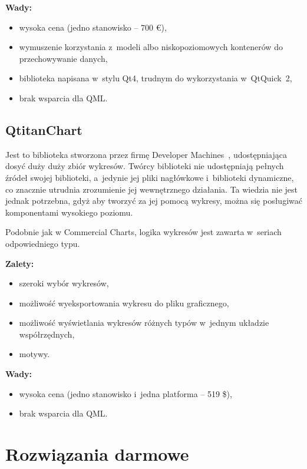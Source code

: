 \documentclass[11pt,twoside,a4paper,final]{llncs}
\begin{document}
\textbf{Wady:}
\begin{itemize}
\item{wysoka cena (jedno stanowisko -- 700 \euro),}
\item{wymuszenie korzystania z~modeli albo niskopoziomowych kontenerów do przechowywanie danych,}
\item{biblioteka napisana w~stylu Qt4, trudnym do wykorzystania w~QtQuick~2,}
\item{brak wsparcia dla QML.}
\end{itemize}

\subsection{QtitanChart}
Jest to biblioteka stworzona przez firmę Developer Machines~\cite{dev-machines}, udostępniająca dosyć duży duży zbiór wykresów. Twórcy biblioteki nie udostępniają pełnych źródeł swojej biblioteki, a~jedynie jej pliki nagłówkowe i~biblioteki dynamiczne, co znacznie utrudnia zrozumienie jej wewnętrznego działania. Ta wiedzia nie jest jednak potrzebna, gdyż aby tworzyć za jej pomocą wykresy, można się posługiwać komponentami wysokiego poziomu.\newline

Podobnie jak w Commercial Charts, logika wykresów jest zawarta w~seriach odpowiedniego typu.\newline

\textbf{Zalety:}
\begin{itemize}
\item{szeroki wybór wykresów,}
\item{możliwość wyeksportowania wykresu do pliku graficznego,}
\item{możliwość wyświetlania wykresów różnych typów w~jednym układzie współrzędnych,}
\item{motywy.}\newline
\end{itemize}

\textbf{Wady:}
\begin{itemize}
\item{wysoka cena (jedno stanowisko i~jedna platforma -- 519 \$),}
\item{brak wsparcia dla QML.}
\end{itemize}


\section{Rozwiązania darmowe} 
\end{document}
